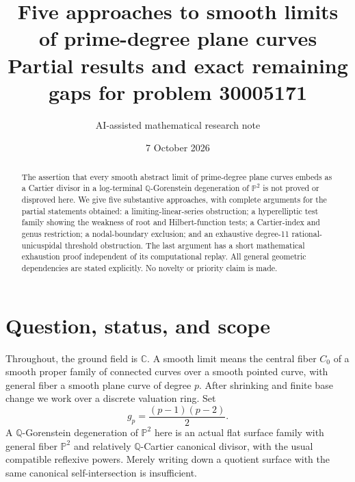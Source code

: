 \documentclass[11pt]{article}
\title{Five approaches to smooth limits of prime-degree plane curves\\\large Partial results and exact remaining gaps for problem 30005171}
\author{AI-assisted mathematical research note}
\date{7 October 2026}
\theoremstyle{remark}\newtheorem{remark}[theorem]{Remark}
\newcommand{\PP}{\mathbb P}\newcommand{\CC}{\mathbb C}\newcommand{\ZZ}{\mathbb Z}
\begin{document}
\maketitle
\begin{abstract}
The assertion that every smooth abstract limit of prime-degree plane curves embeds as a Cartier divisor in a log-terminal $\mathbb Q$-Gorenstein degeneration of $\PP^2$ is not proved or disproved here. We give five substantive approaches, with complete arguments for the partial statements obtained: a limiting-linear-series obstruction; a hyperelliptic test family showing the weakness of root and Hilbert-function tests; a Cartier-index and genus restriction; a nodal-boundary exclusion; and an exhaustive degree-11 rational-unicuspidal threshold obstruction. The last argument has a short mathematical exhaustion proof independent of its computational replay. All general geometric dependencies are stated explicitly. No novelty or priority claim is made.
\end{abstract}
\tableofcontents

\section{Question, status, and scope}
Throughout, the ground field is $\CC$. A smooth limit means the central fiber $C_0$ of a smooth proper family of connected curves over a smooth pointed curve, with general fiber a smooth plane curve of degree $p$. After shrinking and finite base change we work over a discrete valuation ring. Set
\[
 g_p=\frac{(p-1)(p-2)}2.
\]
A $\mathbb Q$-Gorenstein degeneration of $\PP^2$ here is an actual flat surface family with general fiber $\PP^2$ and relatively $\mathbb Q$-Cartier canonical divisor, with the usual compatible reflexive powers. Merely writing down a quotient surface with the same canonical self-intersection is insufficient.
\end{document}
